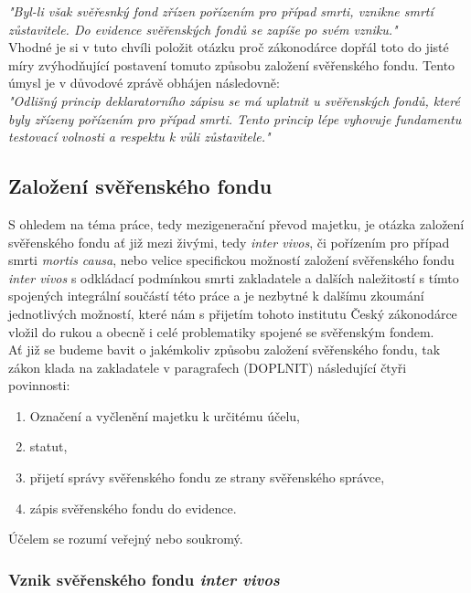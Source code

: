 \documentclass{article}
\begin{document}
\textit{"Byl-li však svěřesnký fond zřízen pořízením pro případ smrti, vznikne smrtí zůstavitele. Do evidence svěřenských fondů se zapíše po svém vzniku."}\\

Vhodné je si v tuto chvíli položit otázku proč zákonodárce dopřál toto do jisté míry zvýhodňující postavení tomuto způsobu založení svěřenského fondu. Tento úmysl je v důvodové zprávě obhájen následovně:\\

\textit{"Odlišný princip deklaratorního zápisu se má uplatnit u svěřenských fondů, které byly zřízeny pořízením pro případ smrti. Tento princip lépe vyhovuje fundamentu testovací volnosti a respektu k vůli zůstavitele."}

\newpage
\thispagestyle{smallertextinheader}

\subsection{Založení svěřenského fondu}

S ohledem na téma práce, tedy mezigenerační převod majetku, je otázka založení svěřenského fondu ať již mezi živými, tedy \textit{inter vivos}, či pořízením pro případ smrti \textit{mortis causa}, nebo velice specifickou možností založení svěřenského fondu \textit{inter vivos} s odkládací podmínkou smrti zakladatele a dalších naležitostí s tímto spojených integrální součástí této práce a je nezbytné k dalšímu zkoumání jednotlivých možností, které nám s přijetím tohoto institutu Český zákonodárce vložil do rukou a obecně i celé problematiky spojené se svěřenským fondem. \\

Ať již se budeme bavit o jakémkoliv způsobu založení svěřenského fondu, tak zákon klada na zakladatele v paragrafech (DOPLNIT) následující čtyři povinnosti:

\begin{enumerate}
\item Označení a vyčlenění majetku k určitému účelu,
\item statut,
\item přijetí správy svěřenského fondu ze strany svěřenského správce,
\item zápis svěřenského fondu do evidence.
\end{enumerate}

Účelem se rozumí veřejný nebo soukromý.

\subsubsection{Vznik svěřenského fondu \textit{inter vivos}}
\end{document}
